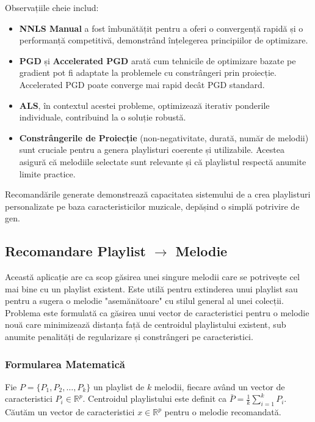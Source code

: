 \documentclass[12pt,a4paper]{article}
\begin{document}
	Observațiile cheie includ:
	\begin{itemize}
		\item \textbf{NNLS Manual} a fost îmbunătățit pentru a oferi o convergență rapidă și o performanță competitivă, demonstrând înțelegerea principiilor de optimizare.
		\item \textbf{PGD} și \textbf{Accelerated PGD} arată cum tehnicile de optimizare bazate pe gradient pot fi adaptate la problemele cu constrângeri prin proiecție. Accelerated PGD poate converge mai rapid decât PGD standard.
		\item \textbf{ALS}, în contextul acestei probleme, optimizează iterativ ponderile individuale, contribuind la o soluție robustă.
		\item \textbf{Constrângerile de Proiecție} (non-negativitate, durată, număr de melodii) sunt cruciale pentru a genera playlisturi coerente și utilizabile. Acestea asigură că melodiile selectate sunt relevante și că playlistul respectă anumite limite practice.
	\end{itemize}
	Recomandările generate demonstrează capacitatea sistemului de a crea playlisturi personalizate pe baza caracteristicilor muzicale, depășind o simplă potrivire de gen.

	\subsection{Recomandare Playlist $\rightarrow$ Melodie}
	Această aplicație are ca scop găsirea unei singure melodii care se potrivește cel mai bine cu un playlist existent. Este utilă pentru extinderea unui playlist sau pentru a sugera o melodie "asemănătoare" cu stilul general al unei colecții. Problema este formulată ca găsirea unui vector de caracteristici pentru o melodie nouă care minimizează distanța față de centroidul playlistului existent, sub anumite penalități de regularizare și constrângeri pe caracteristici.

	\subsubsection{Formularea Matematică}
	Fie $P = \{P_1, P_2, \dots, P_k\}$ un playlist de $k$ melodii, fiecare având un vector de caracteristici $P_i \in \mathbb{R}^p$. Centroidul playlistului este definit ca $\bar{P} = \frac{1}{k} \sum_{i=1}^{k} P_i$. Căutăm un vector de caracteristici $x \in \mathbb{R}^p$ pentru o melodie recomandată.
\end{document}
